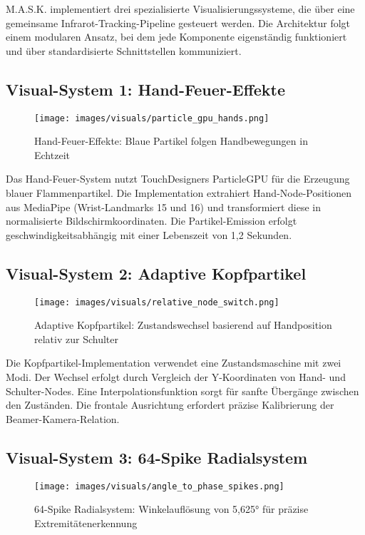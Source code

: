 M.A.S.K. implementiert drei spezialisierte Visualisierungssysteme, die über eine gemeinsame Infrarot-Tracking-Pipeline gesteuert werden. Die Architektur folgt einem modularen Ansatz, bei dem jede Komponente eigenständig funktioniert und über standardisierte Schnittstellen kommuniziert.

\subsection{Visual-System 1: Hand-Feuer-Effekte}

\begin{figure}[h]
    \centering
    \texttt{[image: images/visuals/particle\_gpu\_hands.png]}
    \caption{Hand-Feuer-Effekte: Blaue Partikel folgen Handbewegungen in Echtzeit}
    \label{fig:particle_hands}
\end{figure}

Das Hand-Feuer-System nutzt TouchDesigners ParticleGPU für die Erzeugung blauer Flammenpartikel. Die Implementation extrahiert Hand-Node-Positionen aus MediaPipe (Wrist-Landmarks 15 und 16) und transformiert diese in normalisierte Bildschirmkoordinaten. Die Partikel-Emission erfolgt geschwindigkeitsabhängig mit einer Lebenszeit von 1,2 Sekunden.

\subsection{Visual-System 2: Adaptive Kopfpartikel}

\begin{figure}[h]
    \centering
    \texttt{[image: images/visuals/relative\_node\_switch.png]}
    \caption{Adaptive Kopfpartikel: Zustandswechsel basierend auf Handposition relativ zur Schulter}
    \label{fig:relative_switch}
\end{figure}

Die Kopfpartikel-Implementation verwendet eine Zustandsmaschine mit zwei Modi. Der Wechsel erfolgt durch Vergleich der Y-Koordinaten von Hand- und Schulter-Nodes. Eine Interpolationsfunktion sorgt für sanfte Übergänge zwischen den Zuständen. Die frontale Ausrichtung erfordert präzise Kalibrierung der Beamer-Kamera-Relation.

\subsection{Visual-System 3: 64-Spike Radialsystem}

\begin{figure}[h]
    \centering
    \texttt{[image: images/visuals/angle\_to\_phase\_spikes.png]}
    \caption{64-Spike Radialsystem: Winkelauflösung von 5,625° für präzise Extremitätenerkennung}
    \label{fig:spike_system}
\end{figure}

